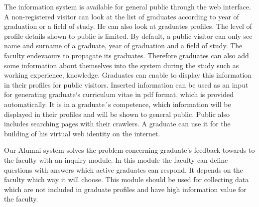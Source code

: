 \documentclass{iitsrc}[2006/14/02]
\begin{document}
The information system is available for general public through the web interface. A non-registered visitor can look at the list of graduates according to year of graduation or a field of study. He can also look at graduates profiles. The level of profile details shown to public is limited. By default, a public visitor can only see name and surname of a graduate, year of graduation and a field of study. The faculty endevaours  to propagate its graduates. Therefore graduates can also add some information about themselves into the system during the study such as working experience, knowledge. Graduates can enable to display this information in their profiles for public visitors. Inserted information can be used as an input for generating graduate`s curriculum vitae in pdf format, which is provided automatically. It is in a graduate´s competence, which information will be displayed in their profiles and will be shown to general public. Public also includes searching pages with their crawlers. A graduate can use it for the building of his virtual web identity on the internet. 

Our Alumni system solves the problem concerning graduate’s feedback towards to the faculty with an inquiry module. In this module the faculty can define questions with answers which active graduates can respond. It depends on the faculty which way it will choose. This module should be used for collecting data which are not included in graduate profiles and have high information value for the faculty.

  

\nocite{team14}
\nocite{team15}
\nocite{cakephp}



\end{document}
